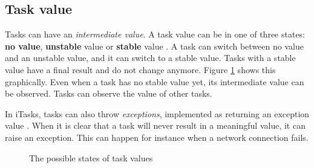 

\subsection{Task value}\label{section-top-task-value}
Tasks can have an \textit{intermediate value}. A task value can be in one of three states: \textbf{no value}, \textbf{unstable} value or \textbf{stable} value \cite[\S 4.3]{achten2013introduction}. A task can switch between no value and an unstable value, and it can switch to a stable value. Tasks with a stable value have a final result and do not change anymore. Figure \ref{fig:task_states} shows this graphically. Even when a task has no stable value yet, its intermediate value can be observed. Tasks can observe the value of other tasks.

In iTasks, tasks can also throw \textit{exceptions}, implemented as returning an exception value \cite[\S 3.1.1]{plasmeijer2012task}. When it is clear that a task will never result in a meaningful value, it can raise an exception. This can happen for instance when a network connection fails.

\begin{figure}
    \centering
    \caption{The possible states of task values}
    \label{fig:task_states}
\end{figure}


